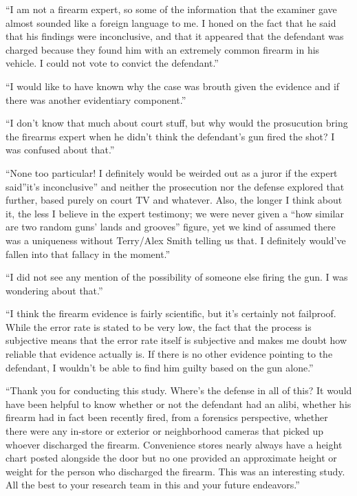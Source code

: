 \documentclass[print]{nuthesis}
\begin{document}
``I am not a firearm expert, so some of the information that the examiner gave almost sounded like a foreign language to me. I honed on the fact that he said that his findings were inconclusive, and that it appeared that the defendant was charged because they found him with an extremely common firearm in his vehicle. I could not vote to convict the defendant.''

``I would like to have known why the case was brouth given the evidence and if there was another evidentiary component.''

``I don't know that much about court stuff, but why would the prosucution bring the firearms expert when he didn't think the defendant's gun fired the shot? I was confused about that.''

``None too particular! I definitely would be weirded out as a juror if the expert said''it's inconclusive'' and neither the prosecution nor the defense explored that further, based purely on court TV and whatever. Also, the longer I think about it, the less I believe in the expert testimony; we were never given a ``how similar are two random guns' lands and grooves'' figure, yet we kind of assumed there was a uniqueness without Terry/Alex Smith telling us that. I definitely would've fallen into that fallacy in the moment.''

``I did not see any mention of the possibility of someone else firing the gun. I was wondering about that.''

``I think the firearm evidence is fairly scientific, but it's certainly not failproof. While the error rate is stated to be very low, the fact that the process is subjective means that the error rate itself is subjective and makes me doubt how reliable that evidence actually is. If there is no other evidence pointing to the defendant, I wouldn't be able to find him guilty based on the gun alone.''

``Thank you for conducting this study. Where's the defense in all of this? It would have been helpful to know whether or not the defendant had an alibi, whether his firearm had in fact been recently fired, from a forensics perspective, whether there were any in-store or exterior or neighborhood cameras that picked up whoever discharged the firearm. Convenience stores nearly always have a height chart posted alongside the door but no one provided an approximate height or weight for the person who discharged the firearm. This was an interesting study. All the best to your research team in this and your future endeavors.''
\end{document}
